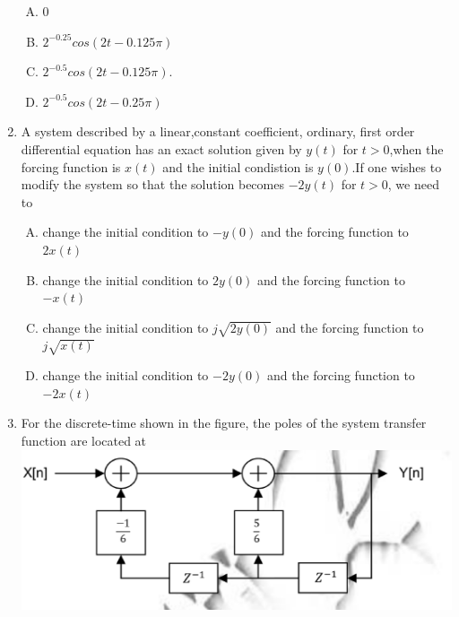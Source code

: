 \documentclass[journal,12pt,twocolumn]{IEEEtran}
\begin{document}
\begin{enumerate}
\begin{enumerate}[(A)]

\setlength\itemsep{2em}

\item 0
\item $2^{-0.25}cos(2t-0.125\pi)$
\item $2^{-0.5}cos(2t-0.125\pi)$.
\item $2^{-0.5}cos(2t-0.25\pi)$


\end{enumerate}

\item A system described by a linear,constant coefficient, ordinary, first order differential equation has an exact solution given by $y(t)$ for $t>0$,when the forcing function is $x(t)$ and the initial condistion is $y(0)$.If one wishes to modify the system so that the solution becomes $-2y(t)$ for $t>0$, we need to
\begin{enumerate}[(A)]

\setlength\itemsep{2mm}

\item change the initial condition to $-y(0)$ and the forcing function to $2x(t)$
\item change the initial condition to $2y(0)$ and the forcing function to $-x(t)$
\item change the initial condition to $j\sqrt{2y(0)}$ and the forcing function to $j\sqrt{x(t)}$
\item change the initial condition to $-2y(0)$ and the forcing function to $-2x(t)$
\end{enumerate}

\item For the discrete-time shown in the figure, the poles of the system transfer function are located at
\includegraphics[scale=0.3]{fig15.eps}
\begin{enumerate}[(A)]
\begin{multicols}{2}
\setlength\itemsep{2em}


\end{multicols}
\end{enumerate}
\end{enumerate}
\end{document}
